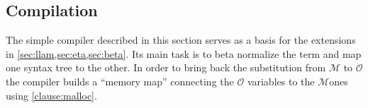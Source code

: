 \documentclass[sigconf,natbib=false,review]{acmart}
\newcommand{\llambda}{\ensuremath{\mathcal{L}}\xspace}
\newcommand{\Fo}{\texorpdfstring{\ensuremath{\mathcal{O}\xspace}}{O}} %
\newcommand{\Ho}{\texorpdfstring{\ensuremath{\mathcal{M}}\xspace}{M}}
\begin{document}







\subsection{Compilation}
\label{sec:compilation}

The simple compiler described in this section serves as a basis for the
extensions in \cref{sec:llam,sec:eta,sec:beta}.
Its main task is to beta normalize the term and map one syntax tree to
the other.
In order to bring back the substitution from \Ho{} to \Fo{} the compiler
builds a ``memory map'' connecting the \Fo{} variables to the \Ho ones
using %
\ref{clause:malloc}.
\end{document}
